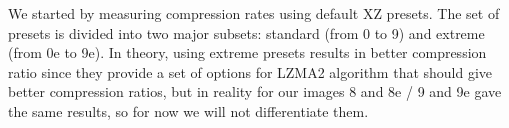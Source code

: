 \documentclass[conference]{IEEEtran}
\begin{document}


%


We started by measuring compression rates using default XZ presets. The set of presets is divided into two major subsets: standard (from 0 to 9) and extreme (from 0e to 9e). In theory, using extreme presets results in better compression ratio since they provide a set of options for LZMA2 algorithm that should give better compression ratios, but in reality for our images 8 and 8e / 9 and 9e gave the same results, so for now we will not differentiate them.
\end{document}
